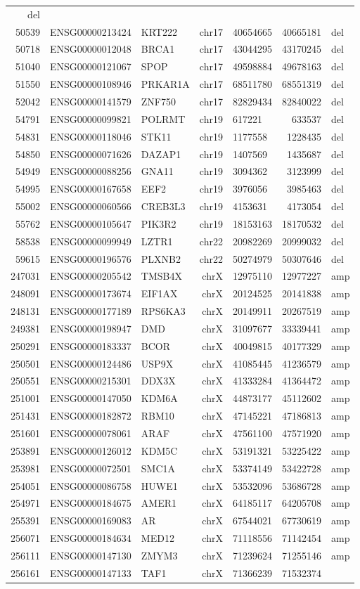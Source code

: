 \documentclass[]{article}
\begin{document}
\begin{longtable}[]{@{}rrlrlrl@{}}
del\tabularnewline
50539 & ENSG00000213424 & KRT222 & chr17 & 40654665 & 40665181 &
del\tabularnewline
50718 & ENSG00000012048 & BRCA1 & chr17 & 43044295 & 43170245 &
del\tabularnewline
51040 & ENSG00000121067 & SPOP & chr17 & 49598884 & 49678163 &
del\tabularnewline
51550 & ENSG00000108946 & PRKAR1A & chr17 & 68511780 & 68551319 &
del\tabularnewline
52042 & ENSG00000141579 & ZNF750 & chr17 & 82829434 & 82840022 &
del\tabularnewline
54791 & ENSG00000099821 & POLRMT & chr19 & 617221 & 633537 &
del\tabularnewline
54831 & ENSG00000118046 & STK11 & chr19 & 1177558 & 1228435 &
del\tabularnewline
54850 & ENSG00000071626 & DAZAP1 & chr19 & 1407569 & 1435687 &
del\tabularnewline
54949 & ENSG00000088256 & GNA11 & chr19 & 3094362 & 3123999 &
del\tabularnewline
54995 & ENSG00000167658 & EEF2 & chr19 & 3976056 & 3985463 &
del\tabularnewline
55002 & ENSG00000060566 & CREB3L3 & chr19 & 4153631 & 4173054 &
del\tabularnewline
55762 & ENSG00000105647 & PIK3R2 & chr19 & 18153163 & 18170532 &
del\tabularnewline
58538 & ENSG00000099949 & LZTR1 & chr22 & 20982269 & 20999032 &
del\tabularnewline
59615 & ENSG00000196576 & PLXNB2 & chr22 & 50274979 & 50307646 &
del\tabularnewline
247031 & ENSG00000205542 & TMSB4X & chrX & 12975110 & 12977227 &
amp\tabularnewline
248091 & ENSG00000173674 & EIF1AX & chrX & 20124525 & 20141838 &
amp\tabularnewline
248131 & ENSG00000177189 & RPS6KA3 & chrX & 20149911 & 20267519 &
amp\tabularnewline
249381 & ENSG00000198947 & DMD & chrX & 31097677 & 33339441 &
amp\tabularnewline
250291 & ENSG00000183337 & BCOR & chrX & 40049815 & 40177329 &
amp\tabularnewline
250501 & ENSG00000124486 & USP9X & chrX & 41085445 & 41236579 &
amp\tabularnewline
250551 & ENSG00000215301 & DDX3X & chrX & 41333284 & 41364472 &
amp\tabularnewline
251001 & ENSG00000147050 & KDM6A & chrX & 44873177 & 45112602 &
amp\tabularnewline
251431 & ENSG00000182872 & RBM10 & chrX & 47145221 & 47186813 &
amp\tabularnewline
251601 & ENSG00000078061 & ARAF & chrX & 47561100 & 47571920 &
amp\tabularnewline
253891 & ENSG00000126012 & KDM5C & chrX & 53191321 & 53225422 &
amp\tabularnewline
253981 & ENSG00000072501 & SMC1A & chrX & 53374149 & 53422728 &
amp\tabularnewline
254051 & ENSG00000086758 & HUWE1 & chrX & 53532096 & 53686728 &
amp\tabularnewline
254971 & ENSG00000184675 & AMER1 & chrX & 64185117 & 64205708 &
amp\tabularnewline
255391 & ENSG00000169083 & AR & chrX & 67544021 & 67730619 &
amp\tabularnewline
256071 & ENSG00000184634 & MED12 & chrX & 71118556 & 71142454 &
amp\tabularnewline
256111 & ENSG00000147130 & ZMYM3 & chrX & 71239624 & 71255146 &
amp\tabularnewline
256161 & ENSG00000147133 & TAF1 & chrX & 71366239 & 71532374 &

\end{longtable}
\end{document}
